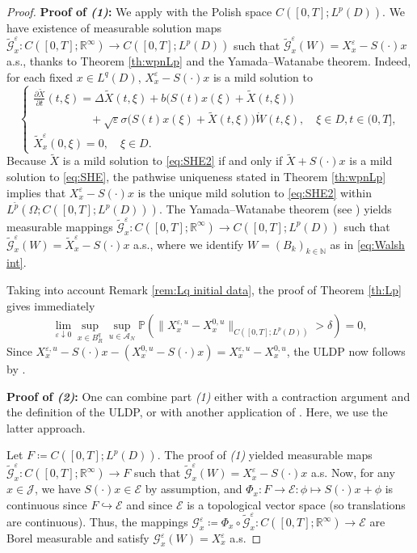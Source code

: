 \documentclass{amsart}
\theoremstyle{plain}
\theoremstyle{remark}
\theoremstyle{plain}
\numberwithin{equation}{section}
\newcommand{\N}{\mathbb{N}}
\newcommand{\R}{\mathbb{R}}
\newcommand{\ceqq}{\coloneqq}
\newcommand{\col}{\colon}
\renewcommand{\P}{{\mathbb P}}
\newcommand{\eps}{\varepsilon}
\newcommand{\G}{\mathcal{G}}
\newcommand{\Om}{\Omega}
\newcommand{\A}{{\mathcal A}}
\newcommand{\into}{\hookrightarrow}
\begin{document}
\begin{proof}
\textbf{Proof of \textit{(1)}:} 
We apply \cite[Th.\ 2.13]{Salins19equivalences} with the  Polish space $C([0,T];L^p(D))$. 
We have existence of measurable solution maps $\tilde{\G}_x^\eps\col C([0,T];\R^\infty)\to C([0,T];L^p(D))$ such that $\tilde{\G}_x^\eps(W)=X_x^{\eps}-S(\cdot)x$ a.s.,  thanks to Theorem \ref{th:wpnLp} and the Yamada--Watanabe theorem. Indeed, for each fixed $x\in L^q(D)$,  $  X_x^\eps-S(\cdot)x$  is a mild solution to 
\begin{equation}\label{eq:SHE2}
\begin{cases}
\frac{\partial \tilde X}{\partial t}(t, \xi) = \Delta \tilde X(t,\xi) + b\big(S(t)x(\xi)+\tilde X(t,\xi)\big)\\
\qquad\qquad\quad+ \sqrt{\eps}  \sigma\big(S(t)x(\xi)+\tilde X(t, \xi)\big)\dot{W}(t,\xi), \quad  \xi \in D, t \in(0,T], \\ 
\tilde X_x^{\eps}(0, \xi) = 0, \quad\xi\in D.
\end{cases}  
\end{equation} 
Because $\tilde X$ is a mild solution to \eqref{eq:SHE2} if and only if $\tilde X+S(\cdot)x$ is a mild solution to \eqref{eq:SHE}, the pathwise uniqueness stated in Theorem \ref{th:wpnLp} implies that  $X_x^\eps-S(\cdot)x$ is the unique mild solution to \eqref{eq:SHE2}  within $L^{\tilde p}(\Om;C([0,T];L^p(D)))$. The Yamada--Watanabe theorem (see \cite{ondrejat}) yields measurable mappings $\tilde{\G}_x^{\eps}\col C([0,T];\R^\infty)\to C([0,T];L^p(D))$ such that $\tilde{\G}_x^{\eps}(W)=\tilde X_x^{\eps}-S(\cdot)x$ a.s., where we identify $W=(B_k)_{k\in\N}$ as in  \eqref{eq:Walsh int}.  

Taking into account Remark \ref{rem:Lq initial data}, the proof of Theorem \ref{th:Lp}    gives immediately 
\begin{equation}\label{eq:lim2}
\lim_{\eps\downarrow 0}\sup_{x\in B_R^q}\sup_{u\in\A_N}\P(\|X_x^{\eps,u}-X_x^{0,u}\|_{C([0,T];L^p(D))}>\delta)=0, 
\end{equation} Since $X_x^{\eps,u}-S(\cdot)x-(X_x^{0,u}-S(\cdot)x)=X_x^{\eps,u}-X_x^{0,u}$,  
the ULDP now follows by \cite[Th.\ 2.13]{Salins19equivalences}. 


\textbf{Proof of \textit{(2)}:} One can combine part \textit{(1)} either with a contraction argument and the definition of the ULDP, or with another application of \cite[Th.\ 3.12]{Salins19equivalences}. Here, we use the latter approach. 

Let $F\ceqq C([0,T];L^p(D))$. The proof of \textit{(1)} yielded    measurable maps 
$\tilde{\G}_x^{\eps}\col C([0,T];\R^\infty)\to F$
such that $\tilde{\G}_x^{\eps}(W)=X_x^{\eps}-S(\cdot)x$ a.s. Now, for any $x\in\mathcal{J}$, we have $S(\cdot)x\in\mathcal{E}$ by assumption, and $\Phi_x\col F\to \mathcal{E}\col \phi\mapsto S(\cdot)x+\phi$ is continuous since $F\into \mathcal{E}$ and since $\mathcal{E}$ is a topological vector space (so translations are continuous). Thus, the mappings ${\G}_x^\eps\ceqq \Phi_x\circ \tilde{\G}_x^\eps\col C([0,T];\R^\infty)\to \mathcal{E}$ are Borel measurable and satisfy $\G_x^{\eps}(W)= X_x^{\eps}$ a.s. 


\end{proof}
\end{document}
